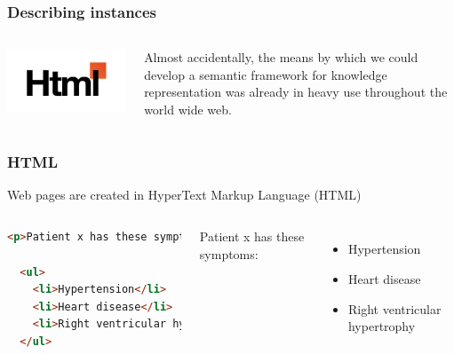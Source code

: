 \documentclass[aspectratio=169]{beamer} %
\begin{document}
\begin{frame}
\frametitle{Describing instances}

\begin{columns}

\includegraphics[width=\textwidth]{resources/html.jpg}


Almost accidentally, the means by which we could develop a semantic
framework for knowledge representation was already in heavy use throughout the
world wide web.

\end{columns}
\end{frame}

\begin{frame}
\frametitle{HTML}
Web pages are created in HyperText Markup Language (HTML)
\begin{columns}


\begin{lstlisting}[language=HTML]
  <p>Patient x has these symptoms:</p>

  <ul>
    <li>Hypertension</li>
    <li>Heart disease</li>
    <li>Right ventricular hypertrophy</li>
  </ul>
\end{lstlisting}


Patient x has these symptoms:

\begin{itemize}
  \item Hypertension
  \item Heart disease
  \item Right ventricular hypertrophy
\end{itemize}

\end{columns}
\end{frame}
\end{document}
